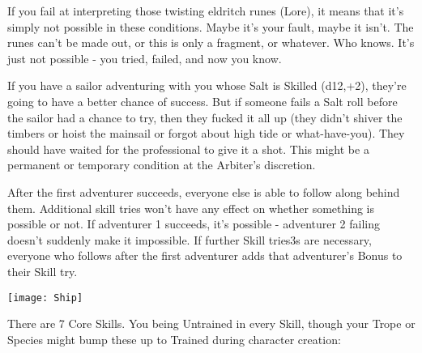 {  If you fail at interpreting those twisting eldritch runes (Lore), it means that it's simply not possible in these conditions.  Maybe it's your fault, maybe it isn't.  The runes can't be made out, or this is only a fragment, or whatever.  Who knows.  It's just not possible - you tried, failed, and now you know.

  If you have a sailor adventuring with you whose Salt is Skilled (d12,+2), they're going to have a better chance of success.  But if someone fails a Salt roll before the sailor had a chance to try, then they fucked it all up (they didn't shiver the timbers or hoist the mainsail or forgot about high tide or what-have-you).  They should have waited for the professional to give it a shot.  This might be a permanent or temporary condition at the Arbiter's discretion.

  After the first adventurer succeeds, everyone else is able to follow along behind them.  Additional skill tries won't have any effect on whether something is possible or not.  If adventurer 1 succeeds, it's possible - adventurer 2 failing doesn't suddenly make it impossible.  If further Skill tries3s are necessary, everyone who follows after the first adventurer adds that adventurer's Bonus to their Skill try.

    \begin{center}
  \texttt{[image: Ship]}
  \end{center}
 
  \cbreak


  There are 7 Core Skills.  You being Untrained in every Skill, though your Trope or Species might bump these up to Trained during character creation:





}
